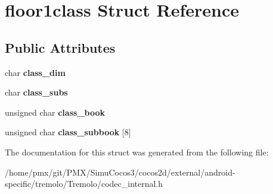 \hypertarget{structfloor1class}{}\section{floor1class Struct Reference}
\label{structfloor1class}
\subsection*{Public Attributes}
\begin{DoxyCompactItemize}
\item 
\mbox{\label{structfloor1class_a73fbdd57218ad22c88706856fc0a53cb}} 
char {\bfseries class\+\_\+dim}
\item 
\mbox{\label{structfloor1class_a5a6a30c5c135866ded31bec19ac0546e}} 
char {\bfseries class\+\_\+subs}
\item 
\mbox{\label{structfloor1class_a9cd799cca5d74ef9027cb3214322ab20}} 
unsigned char {\bfseries class\+\_\+book}
\item 
\mbox{\label{structfloor1class_ae787f075b160bd9914fc094de2d476ab}} 
unsigned char {\bfseries class\+\_\+subbook} \mbox{[}8\mbox{]}
\end{DoxyCompactItemize}


The documentation for this struct was generated from the following file\+:\begin{DoxyCompactItemize}
\item 
/home/pmx/git/\+P\+M\+X/\+Simu\+Cocos3/cocos2d/external/android-\/specific/tremolo/\+Tremolo/codec\+\_\+internal.\+h\end{DoxyCompactItemize}
